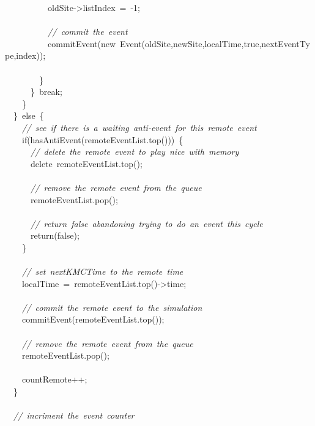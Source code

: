{\ \ \ \ \ \ \ \ \ \ oldSite-{}>{}listIndex\ =\ -{}1;\\
\ \\
\ \ \ \ \ \ \ \ \ \ \textsl{//\ commit\ the\ event}\\
\ \ \ \ \ \ \ \ \ \ commitEvent(new\ Event(oldSite,newSite,localTime,true,nextEventType,index));\\
\ \\
\ \ \ \ \ \ \ \ \}\\
\ \ \ \ \ \ \}\ break;\\
\ \ \ \ \}\\
\ \ \}\ else\ \{\\
\ \ \ \ \textsl{//\ see\ if\ there\ is\ a\ waiting\ anti-{}event\ for\ this\ remote\ event}\\
\ \ \ \ if(hasAntiEvent(remoteEventList.top()))\ \{\\
\ \ \ \ \ \ \textsl{//\ delete\ the\ remote\ event\ to\ play\ nice\ with\ memory}\\
\ \ \ \ \ \ delete\ remoteEventList.top();\\
\ \\
\ \ \ \ \ \ \textsl{//\ remove\ the\ remote\ event\ from\ the\ queue}\\
\ \ \ \ \ \ remoteEventList.pop();\\
\ \\
\ \ \ \ \ \ \textsl{//\ return\ false\ abandoning\ trying\ to\ do\ an\ event\ this\ cycle}\\
\ \ \ \ \ \ return(false);\\
\ \ \ \ \}\\
\ \\
\ \ \ \ \textsl{//\ set\ nextKMCTime\ to\ the\ remote\ time}\\
\ \ \ \ localTime\ =\ remoteEventList.top()-{}>{}time;\\
\ \\
\ \ \ \ \textsl{//\ commit\ the\ remote\ event\ to\ the\ simulation}\\
\ \ \ \ commitEvent(remoteEventList.top());\\
\ \\
\ \ \ \ \textsl{//\ remove\ the\ remote\ event\ from\ the\ queue}\\
\ \ \ \ remoteEventList.pop();\\
\ \\
\ \ \ \ countRemote++;\\
\ \ \}\\
\ \\
\ \ \textsl{//\ incriment\ the\ event\ counter}\\
}
